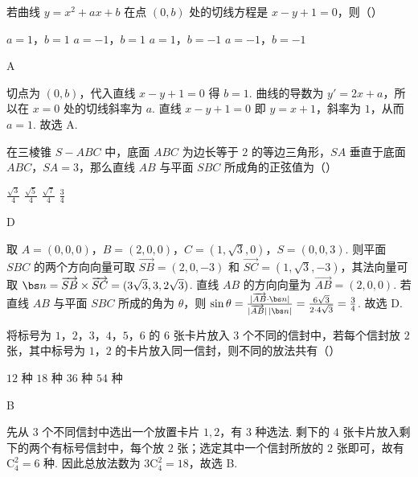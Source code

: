 \begin{problem}
若曲线 \(y = x^{2} + ax + b\) 在点 \((0, b)\) 处的切线方程是 \(x - y + 1 = 0\)，则（\quad）

\choices
    {\(a = 1\)，\(b = 1\)}
    {\(a = -1\)，\(b = 1\)}
    {\(a = 1\)，\(b = -1\)}
    {\(a = -1\)，\(b = -1\)}

\begin{answer}
A
\end{answer}

\begin{solution}
切点为 \((0,b)\)，代入直线 \(x-y+1=0\) 得 \(b=1\). 曲线的导数为 \(y'=2x+a\)，所以在 \(x=0\) 处的切线斜率为 \(a\). 直线 \(x-y+1=0\) 即 \(y=x+1\)，斜率为 \(1\)，从而 \(a=1\). 故选 A.
\end{solution}
\end{problem}

\begin{problem}
在三棱锥 \(S - ABC\) 中，底面 \(ABC\) 为边长等于 \(2\) 的等边三角形，\(SA\) 垂直于底面 \(ABC\)，\(SA = 3\)，那么直线 \(AB\) 与平面 \(SBC\) 所成角的正弦值为（\quad）

\choices
    {\(\frac{\sqrt{3}}{4}\)}
    {\(\frac{\sqrt{5}}{4}\)}
    {\(\frac{\sqrt{7}}{4}\)}
    {\(\frac{3}{4}\)}

\begin{answer}
D
\end{answer}

\begin{solution}
取 \(A=(0,0,0)\)，\(B=(2,0,0)\)，\(C=(1,\sqrt{3},0)\)，\(S=(0,0,3)\). 则平面 \(SBC\) 的两个方向向量可取 \(\overrightarrow{SB}=(2,0,-3)\) 和 \(\overrightarrow{SC}=(1,\sqrt{3},-3)\)，其法向量可取 \(\bs n=\overrightarrow{SB}\times\overrightarrow{SC}=(3\sqrt{3},3,2\sqrt{3})\). 直线 \(AB\) 的方向向量为 \(\overrightarrow{AB}=(2,0,0)\). 若直线 \(AB\) 与平面 \(SBC\) 所成的角为 \(\theta\)，则 \(\sin\theta=\frac{|\overrightarrow{AB}\cdot\bs n|}{|\overrightarrow{AB}|\,|\bs n|}=\frac{6\sqrt{3}}{2\cdot4\sqrt{3}}=\frac{3}{4}\). 故选 D.
\end{solution}
\end{problem}

\begin{problem}
将标号为 \(1\)，\(2\)，\(3\)，\(4\)，\(5\)，\(6\) 的 \(6\) 张卡片放入 \(3\) 个不同的信封中，若每个信封放 \(2\) 张，其中标号为 \(1\)，\(2\) 的卡片放入同一信封，则不同的放法共有（\quad）

\choices
    {\(12\text{ 种}\)}
    {\(18\text{ 种}\)}
    {\(36\text{ 种}\)}
    {\(54\text{ 种}\)}

\begin{answer}
B
\end{answer}

\begin{solution}
先从 \(3\) 个不同信封中选出一个放置卡片 \(1,2\)，有 \(3\) 种选法. 剩下的 \(4\) 张卡片放入剩下的两个有标号信封中，每个放 \(2\) 张；选定其中一个信封所放的 \(2\) 张即可，故有 \(\mathrm C_4^2=6\) 种. 因此总放法数为 \(3\mathrm C_4^2=18\)，故选 B.
\end{solution}
\end{problem}

